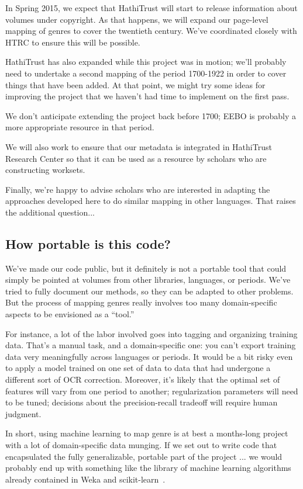 \documentclass[paper=a4, fontsize=12pt]{scrartcl}
\numberwithin{equation}{section}		%
\numberwithin{figure}{section}			%
\numberwithin{table}{section}				%
\begin{document}
In Spring 2015, we expect that HathiTrust will start to release information about volumes under copyright. As that happens, we will expand our page-level mapping of genres to cover the twentieth century. We've coordinated closely with HTRC to ensure this will be possible.

HathiTrust has also expanded while this project was in motion; we'll probably need to undertake a second mapping of the period 1700-1922 in order to cover things that have been added. At that point, we might try some ideas for improving the project that we haven't had time to implement on the first pass. 

We don't anticipate extending the project back before 1700; EEBO is probably a more appropriate resource in that period.

We will also work to ensure that our metadata is integrated in HathiTrust Research Center so that it can be used as a resource by scholars who are constructing worksets.

Finally, we're happy to advise scholars who are interested in adapting the approaches developed here to do similar mapping in other languages. That raises the additional question...

\subsection{How portable is this code?}

We've made our code public, but it definitely is not a portable tool that could simply be pointed at volumes from other libraries, languages, or periods. We've tried to fully document our methods, so they can be adapted to other problems. But the process of mapping genres really involves too many domain-specific aspects to be envisioned as a ``tool.''

For instance, a lot of the labor involved goes into tagging and organizing training data. That's a manual task, and a domain-specific one: you can't export training data very meaningfully across languages or periods. It would be a bit risky even to apply a model trained on one set of data to data that had undergone a different sort of OCR correction. Moreover, it's likely that the optimal set of features will vary from one period to another; regularization parameters will need to be tuned; decisions about the precision-recall tradeoff will require human judgment.

In short, using machine learning to map genre is at best a months-long project with a lot of domain-specific data munging. If we set out to write code that encapsulated the fully generalizable, portable part of the project ... we would probably end up with something like the library of machine learning algorithms already contained in Weka and scikit-learn~\cite{weka, scikit-learn}. 
\end{document}
